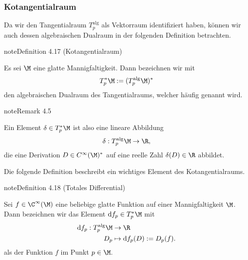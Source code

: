 \documentclass[letterpaper,10pt,english]{jupyterBook}
\begin{document}
\subsubsection{Kotangentialraum}
\label{\detokenize{manifolds/tangential:kotangentialraum}}
\sphinxAtStartPar
Da wir den Tangentialraum \(T^{\text{alg}}_p\) als Vektorraum identifiziert haben, können wir auch dessen algebraischen Dualraum in der folgenden Definition betrachten.
\label{manifolds/tangential:definition-15}
\begin{sphinxadmonition}{note}{Definition 4.17 (Kotangentialraum)}



\sphinxAtStartPar
Es sei \(\M\) eine glatte Mannigfaltigkeit.
Dann bezeichnen wir mit
\begin{equation*}
\begin{split}T_p^\ast\M:= (T_p^{\text{alg}}\M)^\ast\end{split}
\end{equation*}
\sphinxAtStartPar
den algebraischen Dualraum des Tangentialraums, welcher häufig  genannt wird.
\end{sphinxadmonition}
\label{manifolds/tangential:remark-16}
\begin{sphinxadmonition}{note}{Remark 4.5}



\sphinxAtStartPar
Ein Element \(\delta\in T_p^\ast\M\) ist also eine lineare Abbildung
\begin{equation*}
\begin{split}\delta: T_p^{\text{alg}}\M \to \R,\end{split}
\end{equation*}
\sphinxAtStartPar
die eine Derivation \(D\in C^\infty(\M)^\ast\) auf eine reelle Zahl \(\delta(D)\in\R\) abbildet.
\end{sphinxadmonition}

\sphinxAtStartPar
Die folgende Definition beschreibt ein wichtiges Element des Kotangentialraums.
\label{manifolds/tangential:def:totdiff}
\begin{sphinxadmonition}{note}{Definition 4.18 (Totales Differential)}



\sphinxAtStartPar
Sei \(f\in\C^\infty(\M)\) eine beliebige glatte Funktion auf einer Mannigfaltigkeit \(\M\).
Dann bezeichnen wir das Element \(\mathrm{d}f_p \in T_p^\ast\M\) mit
\begin{equation*}
\begin{split}\mathrm{d}f_p: T_p^{\text{alg}}\M &\to\R\\
D_p &\mapsto \mathrm{d}f_p(D):= D_p(f).\end{split}
\end{equation*}
\sphinxAtStartPar
als  der Funktion \(f\) im Punkt \(p \in \M\).
\end{sphinxadmonition}
\end{document}
